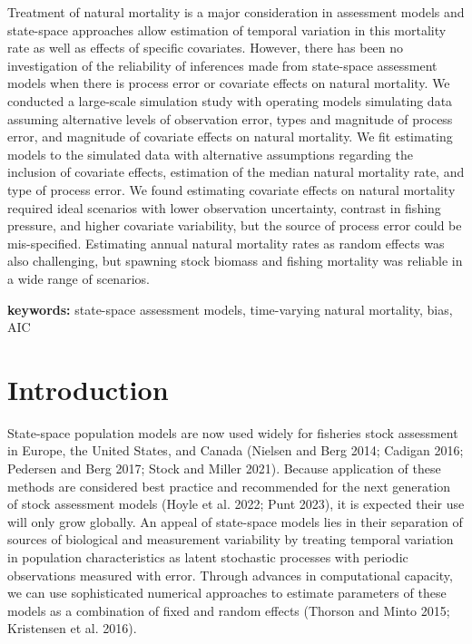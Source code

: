 \documentclass[
  12pt,
]{article}
\begin{document}
Treatment of natural mortality is a major consideration in assessment
models and state-space approaches allow estimation of temporal variation
in this mortality rate as well as effects of specific covariates.
However, there has been no investigation of the reliability of
inferences made from state-space assessment models when there is process
error or covariate effects on natural mortality. We conducted a
large-scale simulation study with operating models simulating data
assuming alternative levels of observation error, types and magnitude of
process error, and magnitude of covariate effects on natural mortality.
We fit estimating models to the simulated data with alternative
assumptions regarding the inclusion of covariate effects, estimation of
the median natural mortality rate, and type of process error. We found
estimating covariate effects on natural mortality required ideal
scenarios with lower observation uncertainty, contrast in fishing
pressure, and higher covariate variability, but the source of process
error could be mis-specified. Estimating annual natural mortality rates
as random effects was also challenging, but spawning stock biomass and
fishing mortality was reliable in a wide range of scenarios.

\textbf{keywords:} state-space assessment models, time-varying natural
mortality, bias, AIC

\pagebreak

\section*{Introduction}\label{introduction}

State-space population models are now used widely for fisheries stock
assessment in Europe, the United States, and Canada (Nielsen and Berg
2014; Cadigan 2016; Pedersen and Berg 2017; Stock and Miller 2021).
Because application of these methods are considered best practice and
recommended for the next generation of stock assessment models (Hoyle et
al. 2022; Punt 2023), it is expected their use will only grow globally.
An appeal of state-space models lies in their separation of sources of
biological and measurement variability by treating temporal variation in
population characteristics as latent stochastic processes with periodic
observations measured with error. Through advances in computational
capacity, we can use sophisticated numerical approaches to estimate
parameters of these models as a combination of fixed and random effects
(Thorson and Minto 2015; Kristensen et al. 2016).
\end{document}
